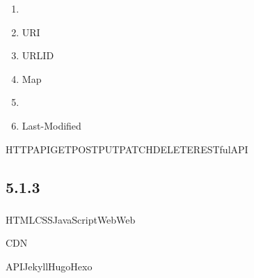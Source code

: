 \important{}

\begin{enumerate}
\def\labelenumi{\arabic{enumi}.}
\item
\item
  URI
\item
  URLID
\item
  Map
\item
\item
  Last-Modified
\end{enumerate}

HTTPAPIGETPOSTPUTPATCHDELETERESTfulAPI

\hypertarget{section-15}{%
\subsection{5.1.3}\label{section-15}}

\hypertarget{section-16}{%
\subsubsection{}\label{section-16}}

HTMLCSSJavaScriptWebWeb\important{}

\important{}\important{}\important{}\important{}CDN

\important{}\important{}API\important{}JekyllHugoHexo

